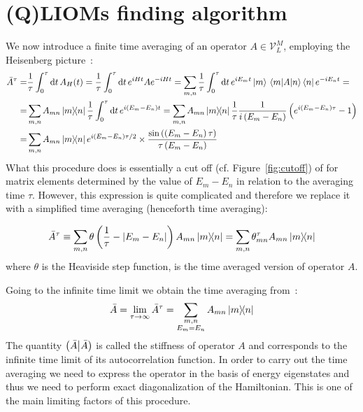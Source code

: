 \section{(Q)LIOMs finding algorithm\label{sec:algorithm}}
We now introduce a finite time averaging of an operator \(A\in \mathcal{V}_L^M\), employing the Heisenberg picture~\autocite{Mierzejewski2015Approx}:
\begin{align}
  \bar{A}^{\tau} = & \frac{1}{\tau} \int_0^{\tau} \mathrm{d}t\, A_{H}(t) = \frac{1}{\tau} \int_0^{\tau} \mathrm{d}t\, e^{i H t}A e^{-i H t}
  =\sum_{m,n} \frac{1}{\tau} \int_0^{\tau} \mathrm{d}t\, e^{i E_m t}\ket{m} \matrixel{m}{A}{n}\bra{n}  e^{-i E_n t} = \nonumber{}           \\
  =                & \sum_{m,n} A_{mn}\ketbra{m}{n} \frac{1}{\tau} \int_0^{\tau} \mathrm{d}t \, e^{i(E_m-E_n)t} =
  \sum_{m,n} A_{mn}\ketbra{m}{n} \frac{1}{\tau} \frac{1}{i\left(E_m-E_n\right)}\left(e^{i\left(E_m-E_n\right)\tau}-1\right) \nonumber       \\
  =                & \sum_{m,n} A_{mn}\ketbra{m}{n}
  e^{i\left(E_m-E_n\right)\tau/2}\times \frac{\sin{\left(\left(E_m-E_n\right)\tau\right)}}{\tau\left(E_m-E_n\right)}
  \label{eq:time_avg}
\end{align}
What this procedure does is essentially a cut off (cf. Figure~\ref{fig:cutoff}) of for matrix elements determined by the value of \(E_m-E_n\) in relation
to the averaging time \(\tau{}\). However, this expression is quite complicated and therefore we replace it with a simplified time
averaging (henceforth time averaging):
\begin{definition}
  \begin{equation}
    \bar{A}^{\tau} \equiv \sum_{m,n} \theta\left(\frac{1}{\tau} - \abs{E_m-E_n}\right) A_{mn} \ketbra{m}{n}
    = \sum_{m,n} \theta_{mn}^{\tau} A_{mn} \ketbra{m}{n}
  \end{equation}
  \label{def:simple time avg}
  where \(\theta{}\) is the Heaviside step function, is the time averaged version of operator \(A\).
\end{definition}
Going to the infinite time limit we obtain the time averaging
from~\textcite{Mierzejewski2015a}:
\begin{equation}
  \bar{A} = \lim_{\tau \to \infty} \bar{A}^{\tau} = \sum_{ \substack{m,n\\E_m=E_n} } A_{mn} \ketbra{m}{n}
  \label{eq:inf time avg}
\end{equation}
The quantity \(\left(\bar{A} \middle| \bar{A}\right)\) is called the stiffness of operator \(A\) and corresponds to the infinite time limit
of its autocorrelation function. In order to carry out the time averaging we need to express the operator
in the basis of energy eigenstates and thus we need to perform exact diagonalization of the Hamiltonian.
This is one of the main limiting factors of this procedure.

